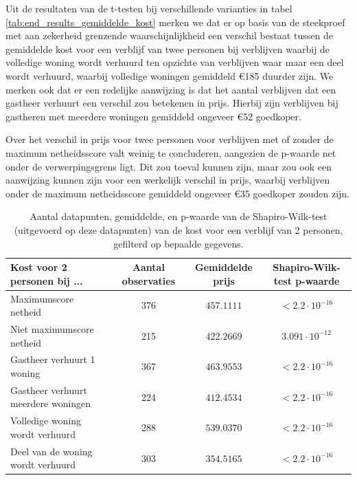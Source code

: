\documentclass[a4paper]{kulakarticle}
\begin{document}
	Uit de resultaten van de t-testen bij verschillende varianties in tabel \ref{tab:end_results_gemiddelde_kost} merken we dat er op basis van de steekproef met aan zekerheid grenzende waarschijnlijkheid een verschil bestaat tussen de gemiddelde kost voor een verblijf van twee personen bij verblijven waarbij de volledige woning wordt verhuurd ten opzichte van verblijven waar maar een deel wordt verhuurd, waarbij volledige woningen gemiddeld €185 duurder zijn. We merken ook dat er een redelijke aanwijzing is dat het aantal verblijven dat een gastheer verhuurt een verschil zou betekenen in prijs. Hierbij zijn verblijven bij gastheren met meerdere woningen gemiddeld ongeveer €52 goedkoper.
	
	Over het verschil in prijs voor twee personen voor verblijven met of zonder de maximum netheidsscore valt weinig te concluderen, aangezien de p-waarde net onder de verwerpingsgrens ligt. Dit zou toeval kunnen zijn, maar zou ook een aanwijzing kunnen zijn voor een werkelijk verschil in prijs, waarbij verblijven onder de maximum netheidsscore gemiddeld ongeveer €35 goedkoper zouden zijn.
	
	\begin{table}
		\caption{Aantal datapunten, gemiddelde, en p-waarde van de Shapiro-Wilk-test (uitgevoerd op deze datapunten) van de kost voor een verblijf van 2 personen, gefilterd op bepaalde gegevens.}
		\label{tab:intermediary_results_gemiddelde_kost}
		\begin{tabular}{|l*{3}{|c}|}
			\hline
			Kost voor 2 personen bij ...        & Aantal observaties & Gemiddelde prijs & Shapiro-Wilk-test p-waarde \\ \hline
			\hline
			Maximumscore netheid                & 376    & $457.1111$ & $< 2.2 \cdot 10^{-16}$ \\ \hline
			Niet maximumscore netheid           & 215    & $422.2669$ & $3.091 \cdot 10^{-12}$ \\ \hline
			Gastheer verhuurt 1 woning          & 367    & $463.9553$ & $< 2.2 \cdot 10^{-16}$ \\ \hline
			Gastheer verhuurt meerdere woningen & 224    & $412.4534$ & $< 2.2 \cdot 10^{-16}$ \\ \hline
			Volledige woning wordt verhuurd     & 288    & $539.0370$ & $< 2.2 \cdot 10^{-16}$ \\ \hline
			Deel van de woning wordt verhuurd   & 303    & $354.5165$ & $< 2.2 \cdot 10^{-16}$ \\ \hline
		\end{tabular}
	\end{table}
\end{document}

